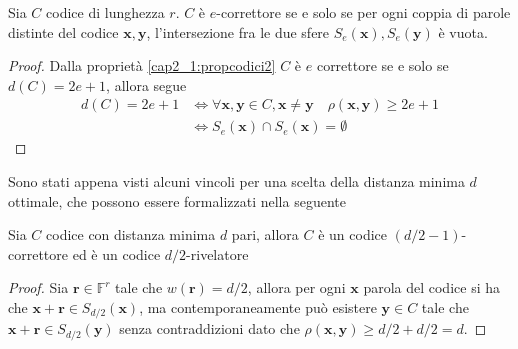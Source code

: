 \begin{prop}
   Sia $C$ codice di lunghezza $r$. $C$ è $e$-correttore se e solo se per ogni coppia di parole distinte del codice $\mathbf{x},\mathbf{y}$, l'intersezione fra le due sfere $S_{e}(\mathbf{x}),S_{e}(\mathbf{y})$ è vuota.
\end{prop}
\begin{proof}
   Dalla proprietà \ref{cap2_1:propcodici2} $C$ è $e$ correttore se e solo se $d(C)= 2e+1$, allora segue
   \begin{align*}
      d(C)= 2e+1
      &\iff \forall \mathbf{x},\mathbf{y} \in C, \mathbf{x} \neq \mathbf{y} \quad \rho(\mathbf{x},\mathbf{y}) \geq 2e + 1 \\
      &\iff S_{e}(\mathbf{x}) \cap S_{e}(\mathbf{x}) = \emptyset
   \end{align*}
\end{proof}
\noindent
Sono stati appena visti alcuni vincoli per una scelta della distanza minima $d$ ottimale, che possono essere formalizzati nella seguente
\begin{prop}
   Sia $C$ codice con distanza minima $d$ pari, allora $C$ è un codice $(d/2-1)$-correttore ed è un codice $d/2$-rivelatore
\end{prop}
\begin{proof}
   Sia $\mathbf{r} \in \mathbb{F}^{r}$ tale che $w(\mathbf{r}) = d/2$, allora per ogni $\mathbf{x}$ parola del codice si ha che $\mathbf{x} + \mathbf{r} \in S_{d/2}(\mathbf{x})$, ma contemporaneamente può esistere $\mathbf{y} \in C$ tale che $\mathbf{x} + \mathbf{r} \in S_{d/2}(\mathbf{y})$ senza contraddizioni dato che $\rho(\mathbf{x}, \mathbf{y}) \geq d/2+d/2 = d$.
\end{proof}

